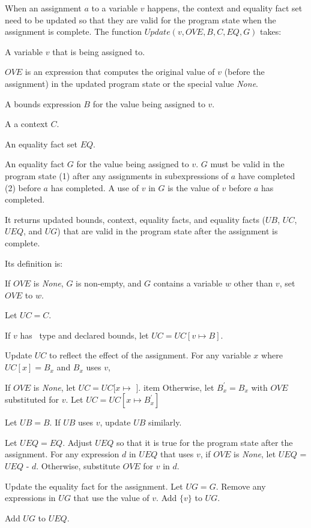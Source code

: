 When an assignment $a$ to a variable $v$ happens, the context and equality fact set 
need to be updated so that they are valid for the program state when the assignment is complete.
The function $Update(v, OVE, B, C, EQ, G)$ takes:
\begin{compactitem}
\item A variable $v$ that is being assigned to.
\item $OVE$ is an expression that computes the original value of $v$ 
(before the assignment) in the updated program state or the special value {\it None}.
\item A bounds expression $B$ for the value being assigned to $v$.
\item A a context $C$.
\item An equality fact set $EQ$. 
\item An equality fact $G$ for the value being assigned to $v$.  $G$ must be valid in the program
state (1) after any assignments in subexpressions of $a$ have completed (2) before $a$
has completed.   A use of $v$ in $G$ is the value of $v$ before $a$ has completed.
\end{compactitem}
It returns updated bounds, context, equality facts, and equality facts ($UB$, $UC$, $UEQ$, and $UG$)
that are valid in the program state after the assignment is complete.

Its definition is:
\begin{compactenum}
\item If $OVE$ is {\em None}, $G$ is non-empty, and $G$ contains a variable $w$ other than $v$,
set $OVE$ to $w$. 
\item Let $UC = C$.
\item If $v$ has \arrayptr\ type and declared bounds, let $UC = UC[v \mapsto B]$.
\item Update $UC$ to reflect the effect of the assignment.  For any variable $x$ where $UC[x] = B_x$ and
$B_x$ uses $v$,
\begin{compactenum}
\item If $OVE$ is {\it None}, let $UC = UC[x \mapsto$ \boundsunknown $]$.
item  Otherwise, let $B_x^\prime = B_x$ with $OVE$ substituted for $v$.  
Let $UC = UC[x \mapsto B_x^\prime]$
\end{compactenum}
\item Let $UB = B$.  If $UB$ uses $v$, update $UB$ similarly.
\item Let $UEQ = EQ$.  Adjust $UEQ$ so that it is true for the program state after the assignment. For any expression $d$ in $UEQ$ that uses $v$, if $OVE$ is {\it None}, let $UEQ$ = $UEQ $ - $d$. Otherwise,
substitute $OVE$ for $v$ in $d$.
\item Update the equality fact for the assignment.   Let $UG = G$.  Remove any expressions in $UG$
that use the value of $v$. Add $\{v\}$ to $UG$.
\item Add $UG$ to $UEQ$.
\end{compactenum}

